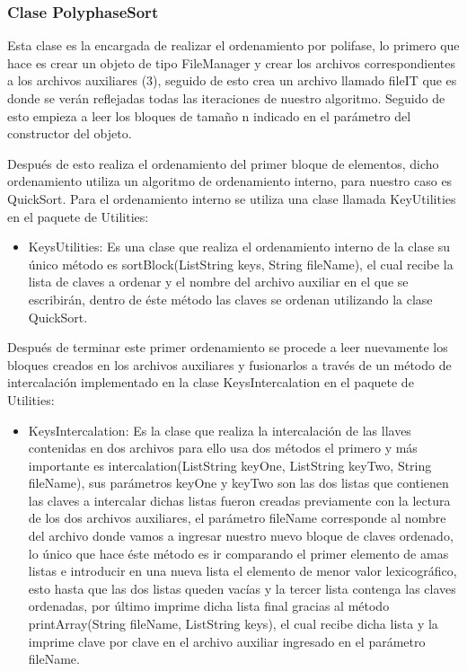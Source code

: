 \documentclass[11pt]{article}
\begin{document}
\subsubsection{Clase PolyphaseSort}
\par
Esta clase es la encargada de realizar el ordenamiento por polifase, lo primero que hace es crear un objeto de tipo FileManager y crear los archivos correspondientes a los archivos auxiliares (3), seguido de esto crea un archivo llamado fileIT que es donde se verán reflejadas todas las iteraciones de nuestro algoritmo. Seguido de esto empieza a leer los bloques de tamaño n indicado en el parámetro del constructor del objeto.
\par
Después de esto realiza el ordenamiento del primer bloque de elementos, dicho ordenamiento utiliza un algoritmo de ordenamiento interno, para nuestro caso es QuickSort. Para el ordenamiento interno se utiliza una clase llamada KeyUtilities en el paquete de Utilities: 
\begin{itemize}
\item KeysUtilities: Es una clase que realiza el ordenamiento interno de la clase su único método es sortBlock(List\<String\> keys, String fileName), el cual recibe la lista de claves a ordenar y el nombre del archivo auxiliar en el que se escribirán, dentro de éste método las claves se ordenan utilizando la clase QuickSort.
\end{itemize}
\par
Después de terminar este primer ordenamiento se procede a leer nuevamente los bloques creados en los archivos auxiliares y fusionarlos a través de un método de intercalación implementado en la clase KeysIntercalation en el paquete de Utilities:
\begin{itemize}
\item KeysIntercalation: Es la clase que realiza la intercalación de las llaves contenidas en dos archivos para ello usa dos métodos el primero y más importante es intercalation(List\<String\> keyOne, List\<String\> keyTwo, String fileName), sus parámetros keyOne y keyTwo son las dos listas que contienen las claves a intercalar dichas listas fueron creadas previamente con la lectura de los dos archivos auxiliares, el parámetro fileName corresponde al nombre del archivo donde vamos a ingresar nuestro nuevo bloque de claves ordenado, lo único que hace éste método es ir comparando el primer elemento de amas listas e introducir en una nueva lista el elemento de menor valor lexicográfico, esto hasta que las dos listas queden vacías y la tercer lista contenga las claves ordenadas, por último imprime dicha lista final gracias al método printArray(String fileName, List\<String\> keys), el cual recibe dicha lista y la imprime clave por clave en el archivo auxiliar ingresado en el parámetro fileName.
\end{itemize}
\end{document}
